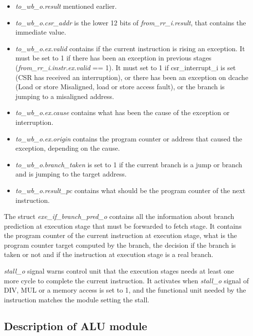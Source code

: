 \begin{itemize}
    \item \emph{to\_wb\_o.result} mentioned earlier.
    \item \emph{to\_wb\_o.csr\_addr} is the lower 12 bits of \emph{from\_rr\_i.result}, that contains the immediate value.
    \item \emph{to\_wb\_o.ex.valid} contains if the current instruction is rising an exception. It must be set to 1 if there has been an exception in previous stages (\emph{from\_rr\_i.instr.ex.valid} == 1). It must set to 1 if csr\_interrupt\_i is set (CSR has received an interruption), or there has been an exception on dcache (Load or store Misaligned, load or store access fault), or the branch is jumping to a misaligned address. 
    \item \emph{to\_wb\_o.ex.cause} contains what has been the cause of the exception or interruption.
    \item \emph{to\_wb\_o.ex.origin} contains the program counter or address that caused the exception, depending on the cause.
    \item \emph{to\_wb\_o.branch\_taken} is set to 1 if the current branch is a jump or branch and is jumping to the target address.
    \item \emph{to\_wb\_o.result\_pc} contains what should be the program counter of the next instruction.
\end{itemize}

The struct \emph{exe\_if\_branch\_pred\_o} contains all the information about branch prediction at execution stage that must be forwarded to fetch stage. It contains the program counter of the current instruction at execution stage, what is the program counter target computed by the branch, the decision if the branch is taken or not and if the instruction at execution stage is a real branch.

\emph{stall\_o} signal warns control unit that the execution stages needs at least one more cycle to complete the current instruction. It activates when \emph{stall\_o} signal of DIV, MUL or a memory access is set to 1, and the functional unit needed by the instruction matches the module setting the stall.


\subsection{Description of ALU module}

